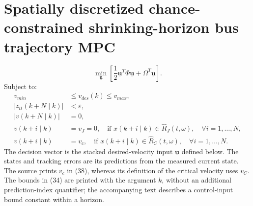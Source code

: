 \documentclass{article}
\newcommand{\uv}{\underline{\mathbf{u}}}
\begin{document}
\section*{Spatially discretized chance-constrained shrinking-horizon bus trajectory MPC}
\begin{equation}
\min_{\uv}\left[\frac12\uv^T\Phi\uv+\Omega^T\uv\right].
\tag{33}
\end{equation}
Subject to:
\begin{align}
v_{min}&\leq v_{des}(k)\leq v_{max}, \tag{34}\\
\left|z_{tt}(k+N\mid k)\right|&<\varepsilon, \tag{35}\\
\left|v(k+N\mid k)\right|&=0, \tag{36}\\
v(k+i\mid k)&=v_J=0,
\quad\text{if }x(k+i\mid k)\in\hat R_J(t,\omega),
\quad\forall i=1,\ldots,N, \tag{37}\\
v(k+i\mid k)&=v_c,
\quad\text{if }x(k+i\mid k)\in\hat R_C(t,\omega),
\quad\forall i=1,\ldots,N. \tag{38}
\end{align}
The decision vector is the stacked desired-velocity input \(\uv\) defined below. The states and tracking errors are its predictions from the measured current state. The source prints \(v_c\) in (38), whereas its definition of the critical velocity uses \(v_C\). The bounds in (34) are printed with the argument \(k\), without an additional prediction-index quantifier; the accompanying text describes a control-input bound constant within a horizon.
\end{document}
